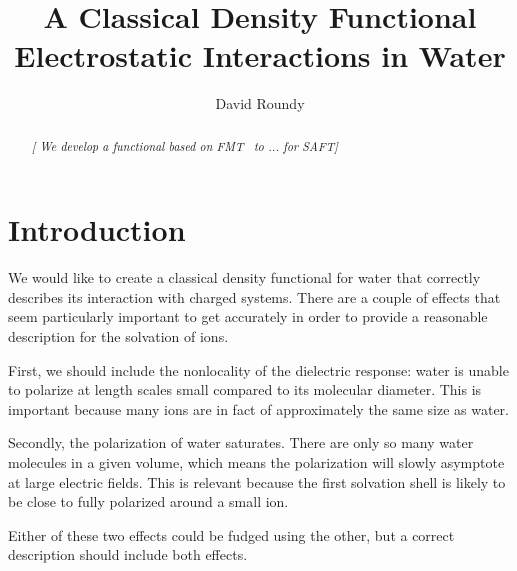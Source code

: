 \documentclass[letterpaper,twocolumn,amsmath,amssymb,prb]{revtex4-1}
\newcommand{\needsworklater}[1]{\emph{[#1]}}
\begin{document}
\title{A Classical Density Functional Electrostatic Interactions in Water }

\author{David Roundy}

\begin{abstract}
\needsworklater{ We develop a functional based on FMT~\cite{roth2002whitebear}
 to ... for SAFT}
\end{abstract}

\maketitle

\section{Introduction}
We would like to create a classical density functional for water that
correctly describes its interaction with charged systems.  There are a
couple of effects that seem particularly important to get accurately
in order to provide a reasonable description for the solvation of
ions.

First, we should include the nonlocality of the dielectric response:
water is unable to polarize at length scales small compared to its
molecular diameter.  This is important because many ions are in fact
of approximately the same size as water.

Secondly, the polarization of water saturates.  There are only so many
water molecules in a given volume, which means the polarization will
slowly asymptote at large electric fields.  This is relevant because
the  first solvation shell is likely to be close to fully polarized
around a small ion.

Either of these two  effects could be fudged using the other, but a
correct description should include both effects.

\end{document}
